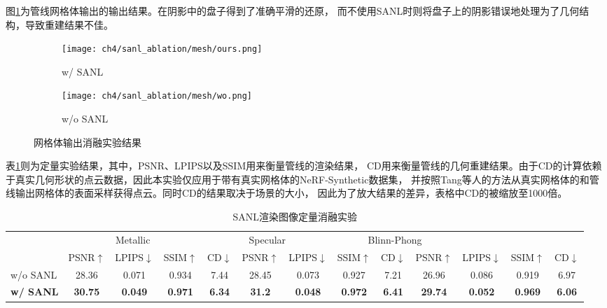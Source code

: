 图\ref{fig:mesh_ablation}为管线网格体输出的输出结果。在阴影中的盘子得到了准确平滑的还原，
而不使用SANL时则将盘子上的阴影错误地处理为了几何结构，导致重建结果不佳。

\begin{figure}[H]
  \centering
  \begin{subfigure}[c]{0.47\textwidth}
    \centering
    \texttt{[image: ch4/sanl\_ablation/mesh/ours.png]}
    \caption{w/ SANL}
  \end{subfigure}
  \begin{subfigure}[c]{0.47\textwidth}
    \centering
    \texttt{[image: ch4/sanl\_ablation/mesh/wo.png]}
    \caption{w/o SANL}
  \end{subfigure}
  \caption{网格体输出消融实验结果}
  \label{fig:mesh_ablation}
\end{figure}

表\ref{tab:sanl_quan}则为定量实验结果，其中，PSNR、LPIPS以及SSIM用来衡量管线的渲染结果，
CD用来衡量管线的几何重建结果。由于CD的计算依赖于真实几何形状的点云数据，因此本实验仅应用于带有真实网格体的NeRF-Synthetic数据集，
并按照Tang等人\cite{Tang_2023}的方法从真实网格体的和管线输出网格体的表面采样获得点云。同时CD的结果取决于场景的大小，
因此为了放大结果的差异，表格中CD的被缩放至1000倍。

\begin{table}[h]
  \centering
  \caption{SANL渲染图像定量消融实验}
  \begin{tabular}{l cccc cccc cccc}
      \toprule
      & \multicolumn{3}{c}{Metallic} & \multicolumn{3}{c}{Specular} & \multicolumn{3}{c}{Blinn-Phong} \\
      \cmidrule(lr){2-4} \cmidrule(lr){5-7} \cmidrule(lr){8-10}
      & PSNR$\uparrow$ & LPIPS$\downarrow$ & SSIM$\uparrow$ & CD$\downarrow$ & PSNR$\uparrow$ & LPIPS$\downarrow$ & SSIM$\uparrow$ & CD$\downarrow$ & PSNR$\uparrow$ & LPIPS$\downarrow$ & SSIM$\uparrow$ & CD$\downarrow$\\
      \midrule
      w/o SANL & 28.36 & 0.071 & 0.934 & 7.44 & 28.45 & 0.073 & 0.927 & 7.21 & 26.96 & 0.086 & 0.919 & 6.97\\
      \textbf{w/ SANL} & \textbf{30.75} & \textbf{0.049} & \textbf{0.971} & \textbf{6.34} & \textbf{31.2} & \textbf{0.048} & \textbf{0.972} & \textbf{6.41} & \textbf{29.74} & \textbf{0.052} & \textbf{0.969} & \textbf{6.06} \\
      \bottomrule
  \end{tabular}
  \label{tab:sanl_quan}
\end{table}

